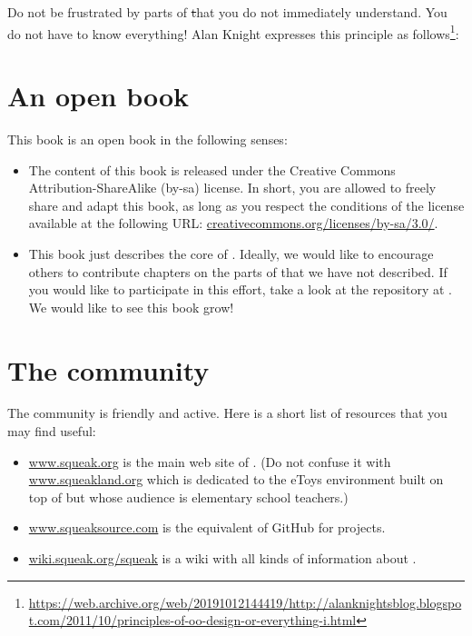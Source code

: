\documentclass[a4paper,10pt,twoside]{book}
\begin{document}
Do not be frustrated by parts of \st that you do not immediately understand.
You do not have to know everything!
Alan Knight expresses this principle as follows\footnote{\url{https://web.archive.org/web/20191012144419/http://alanknightsblog.blogspot.com/2011/10/principles-of-oo-design-or-everything-i.html}}:

\section*{An open book}

This book is an open book in the following senses: 

\begin{itemize}

\item	The content of this book is released under the Creative Commons Attribution-ShareAlike (by-sa) license.
		In short, you are allowed to freely share and adapt this book, as long as you respect the conditions of the license available at the following URL: 
		\url{creativecommons.org/licenses/by-sa/3.0/}.

\item	This book just describes the core of \sq.
		Ideally, we would like to encourage others to contribute chapters on the parts of \sq that we have not described.
		If you would like to participate in this effort, take a look at the repository at \sbeRepoUrl.
		We would like to see this book grow!
\end{itemize}

\section*{The \sq community}

The \sq community is friendly and active.
Here is a short list of resources that you may find useful:

\begin{itemize}
\item \url{www.squeak.org} is the main web site of \sq.
(Do not confuse it with \url{www.squeakland.org} which is dedicated to the eToys environment built on top of \sq but whose audience is elementary school teachers.)

\item \url{www.squeaksource.com} is the equivalent of GitHub for \sq projects.

\item \url{wiki.squeak.org/squeak} is a wiki with all kinds of information about \sq.
\end{itemize}
\end{document}
